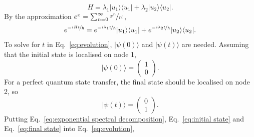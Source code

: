 \documentclass[reprint, aps, 12pt, floatfix]{revtex4-2}
\begin{document}
\begin{equation}
    \label{eq:hamiltonian spectral decomposition}
    H=\lambda_1|u_1\rangle\langle u_1|+\lambda_2|u_2\rangle\langle u_2|.
\end{equation}
By the approximation $e^x=\sum_{n=0}^\infty\nicefrac{x^n}{n!}$,
\begin{equation}
    \label{eq:exponential spectral decomposition}
    e^{-\nicefrac{iHt}{\hbar}}=e^{-\nicefrac{i\lambda_1t}{\hbar}}|u_1\rangle\langle u_1|+e^{-\nicefrac{i\lambda_2t}{\hbar}}|u_2\rangle\langle u_2|.
\end{equation}
To solve for $t$ in Eq.~\ref{eq:evolution}, $|\psi(0)\rangle$ and $|\psi(t)\rangle$ are needed. Assuming that the initial state is localised on node 1,
\begin{equation}
    \label{eq:initial state}
    |\psi(0)\rangle=\begin{pmatrix}
        1\\
        0
    \end{pmatrix}.
\end{equation}
For a perfect quantum state transfer, the final state should be localised on node 2, so
\begin{equation}
    \label{eq:final state}
    |\psi(t)\rangle=\begin{pmatrix}
        0\\
        1
    \end{pmatrix}.
\end{equation}
Putting Eq.~\ref{eq:exponential spectral decomposition}, Eq.~\ref{eq:initial state} and Eq.~\ref{eq:final state} into Eq.~\ref{eq:evolution},
\end{document}
